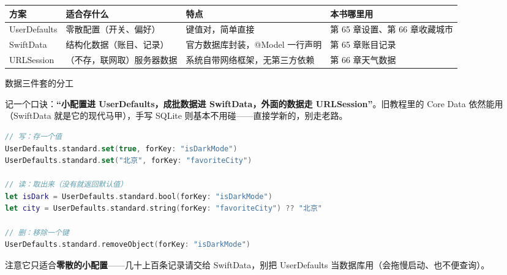 


\begin{center}
\begin{tabularx}{\linewidth}{|X|X|X|X|}
\hline
\textbf{方案} & \textbf{适合存什么} & \textbf{特点} & \textbf{本书哪里用} \tabularnewline
\hline
UserDefaults & 零散配置（开关、偏好） & 键值对，简单直接 & 第 65 章设置、第 66 章收藏城市 \tabularnewline
SwiftData & 结构化数据（账目、记录） & 官方数据库封装，@Model 一行声明 & 第 65 章账目记录 \tabularnewline
URLSession & （不存，联网取）服务器数据 & 系统自带网络框架，无第三方依赖 & 第 66 章天气数据 \tabularnewline
\hline
\end{tabularx}
\end{center}

\begin{center}\small\color{gray}数据三件套的分工\end{center}

记一个口诀：\textbf{“小配置进 UserDefaults，成批数据进 SwiftData，外面的数据走 URLSession”}。旧教程里的 Core Data 依然能用（SwiftData 就是它的现代马甲），手写 SQLite 则基本不用碰——直接学新的，别走老路。


\begin{lstlisting}[language=Swift]
// 写：存一个值
UserDefaults.standard.set(true, forKey: "isDarkMode")
UserDefaults.standard.set("北京", forKey: "favoriteCity")

// 读：取出来（没有就返回默认值）
let isDark = UserDefaults.standard.bool(forKey: "isDarkMode")
let city = UserDefaults.standard.string(forKey: "favoriteCity") ?? "北京"

// 删：移除一个键
UserDefaults.standard.removeObject(forKey: "isDarkMode")
\end{lstlisting}

注意它只适合\textbf{零散的小配置}——几十上百条记录请交给 SwiftData，别把 UserDefaults 当数据库用（会拖慢启动、也不便查询）。


